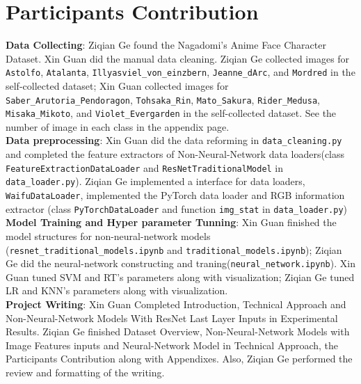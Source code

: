 \documentclass[11.5pt]{article}
\begin{document}
    \section{Participants Contribution}
    \textbf{Data Collecting}: Ziqian Ge found the Nagadomi's Anime Face Character Dataset. Xin Guan did the manual data cleaning. Ziqian Ge collected images for \texttt{Astolfo}, \texttt{Atalanta}, \texttt{Illyasviel\_von\_einzbern}, \texttt{Jeanne\_dArc}, and \texttt{Mordred} in the self-collected dataset; Xin Guan collected images for \texttt{Saber\_Arutoria\_Pendoragon}, \texttt{Tohsaka\_Rin}, \texttt{Mato\_Sakura}, \texttt{Rider\_Medusa}, \texttt{Misaka\_Mikoto}, and \texttt{Violet\_Evergarden} in the self-collected dataset. See the number of image in each class in the appendix page.\\
    \textbf{Data preprocessing}: Xin Guan did the data reforming in \texttt{data\_cleaning.py} and completed the feature extractors of Non-Neural-Network data loaders(class \texttt{FeatureExtractionDataLoader} and \texttt{ResNetTraditionalModel} in \texttt{data\_loader.py}). Ziqian Ge implemented a interface for data loaders, \texttt{WaifuDataLoader}, implemented the PyTorch data loader and RGB information extractor (class \texttt{PyTorchDataLoader} and function \texttt{img\_stat} in \texttt{data\_loader.py}) \\
    \textbf{Model Training and Hyper parameter Tunning}: Xin Guan finished the model structures for non-neural-network models (\texttt{resnet\_traditional\_models.ipynb} and \texttt{traditional\_models.ipynb}); Ziqian Ge did the neural-network constructing and traning(\texttt{neural\_network.ipynb}). Xin Guan tuned SVM and RT's parameters along with visualization; Ziqian Ge tuned LR and KNN's parameters along with visualization. \\
    \textbf{Project Writing}: Xin Guan Completed Introduction, Technical Approach and Non-Neural-Network Models With ResNet Last Layer Inputs in Experimental Results. Ziqian Ge finished Dataset Overview, Non-Neural-Network Models with Image Features inputs and Neural-Network Model in Technical Approach, the Participants Contribution along with Appendixes. Also, Ziqian Ge performed the review and formatting of the writing.
    \vspace{10mm}
\end{document}
